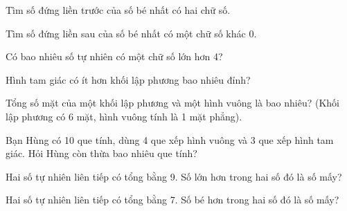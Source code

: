 \begin{ex}
Tìm số đứng liền trước của số bé nhất có hai chữ số.
\end{ex}

\begin{ex}
Tìm số đứng liền sau của số bé nhất có một chữ số khác 0.
\end{ex}

\begin{ex}
Có bao nhiêu số tự nhiên có một chữ số lớn hơn 4?
\end{ex}

\begin{ex}
Hình tam giác có ít hơn khối lập phương bao nhiêu đỉnh?
\end{ex}

\begin{ex}
Tổng số mặt của một khối lập phương và một hình vuông là bao nhiêu? (Khối lập phương có 6 mặt, hình vuông tính là 1 mặt phẳng).
\end{ex}

\begin{ex}
Bạn Hùng có 10 que tính, dùng 4 que xếp hình vuông và 3 que xếp hình tam giác. Hỏi Hùng còn thừa bao nhiêu que tính?
\end{ex}

\begin{ex}
Hai số tự nhiên liên tiếp có tổng bằng 9. Số lớn hơn trong hai số đó là số mấy?
\end{ex}

\begin{ex}
Hai số tự nhiên liên tiếp có tổng bằng 7. Số bé hơn trong hai số đó là số mấy?
\end{ex}

